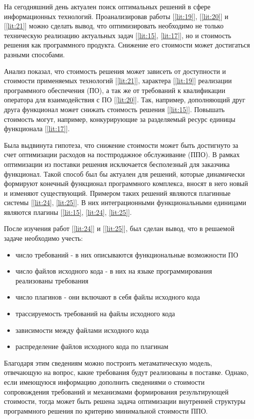 На сегодняшний день актуален поиск оптимальных решений в сфере информационных технологий. Проанализировав работы [\ref{lit:19}], [\ref{lit:20}] и [\ref{lit:21}] можно сделать вывод, что оптимизировать необходимо не только техническую реализацию актуальных задач [\ref{lit:15}, \ref{lit:17}], но и стоимость решения как программного продукта. Снижение его стоимости может достигаться разными способами.

Анализ показал, что стоимость решения может зависеть от доступности и стоимости применяемых технологий [\ref{lit:21}], характера [\ref{lit:19}] реализации программного обеспечения (ПО), а так же от требований к квалификации оператора для взаимодействия с ПО [\ref{lit:20}]. Так, например, дополняющий друг друга функционал может снижать стоимость решения [\ref{lit:15}]. Повышать стоимость могут, например, конкурирующие за разделяемый ресурс единицы функционала [\ref{lit:17}].

Была выдвинута гипотеза, что снижение стоимости может быть достигнуто за счет оптимизации расходов на постпродажное обслуживание (ППО). В рамках оптимизации из поставки решения исключается бесполезный для заказчика функционал. Такой способ был бы актуален для решений, которые динамически формируют конечный функционал программного комплекса, вносят в него новый и изменяют существующий. Примером таких решений являются плагинные системы [\ref{lit:24}, \ref{lit:25}]. В них интеграционными функциональными единицами являются плагины [\ref{lit:15}, \ref{lit:24}, \ref{lit:25}].

После изучения работ [\ref{lit:24}] и [\ref{lit:25}], был сделан вывод, что в решаемой задаче необходимо учесть:
\begin{itemize}
  \item число требований - в них описываются функциональные возможности ПО
  \item число файлов исходного кода - в них на языке программирования реализованы требования
  \item число плагинов - они включают в себя файлы исходного кода
  \item трассируемость требований на файлы исходного кода
  \item зависимости между файлами исходного кода
  \item распределение файлов исходного кода по плагинам
\end{itemize}

Благодаря этим сведениям можно построить метаматическую модель, отвечающую на вопрос, какие требования будут реализованы в поставке. Однако, если имеющуюся информацию дополнить сведениями о стоимости сопровождения требований и механизмами формирования результирующей стоимости, тогда может быть решена задача оптимизации внутренней структуры программного решения по критерию минимальной стоимости ППО.
